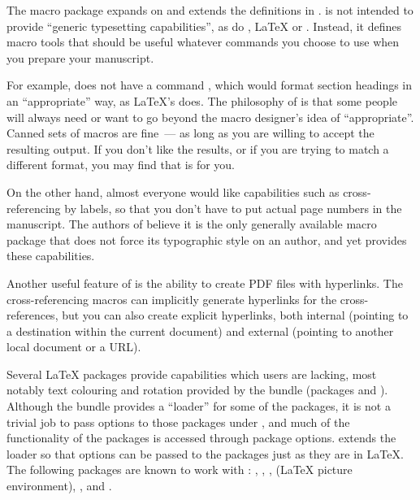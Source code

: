 
The \href{http://tug.org/eplain}{\Eplain{}}
macro package expands on and extends the definitions in \plaintex{}.
\Eplain{} is not intended to provide ``generic typesetting
capabilities'', as do \CONTeXT{}, \LaTeX{} or
.  Instead, it defines macro tools that
should be useful whatever commands you choose to use when you prepare
your manuscript.

For example, \Eplain{} does not have a command ,
which would format section headings in an ``appropriate'' way, as
\LaTeX{}'s  does.  The philosophy of \Eplain{} is that
some people will always need or want to go beyond the macro designer's
idea of ``appropriate''.  Canned sets of macros are fine~--- as long as you
are willing to accept the resulting output.  If you don't like the
results, or if you are trying to match a different format, you may
find that \Eplain{} is for you.

On the other hand, almost everyone would like capabilities such as
cross-referencing by labels, so that you don't have to put actual page
numbers in the manuscript.  The authors of \Eplain{} believe it is the
only generally available macro package that does not force its
typographic style on an author, and yet provides these capabilities.

Another useful feature of \Eplain{} is the ability to create PDF files
with hyperlinks.  The cross-referencing macros can implicitly generate
hyperlinks for the cross-references, but you can also create explicit
hyperlinks, both internal (pointing to a destination within the
current document) and external (pointing to another local document or
a URL).

Several \LaTeX{} packages provide capabilities which \plaintex{}
users are lacking, most notably text colouring and rotation provided by
the  bundle (packages  and
).  Although the  bundle provides
a \plaintex{} ``loader'' for some of the packages, it is not a
trivial job to pass options to those packages under \plaintex{}, and
much of the functionality of the packages is accessed through package
options.  \Eplain{} extends the loader so that options can be passed
to the packages just as they are in \LaTeX{}.  The following packages are
known to work with \Eplain{}:  , ,
,  (\LaTeX{} picture environment),
, and .

